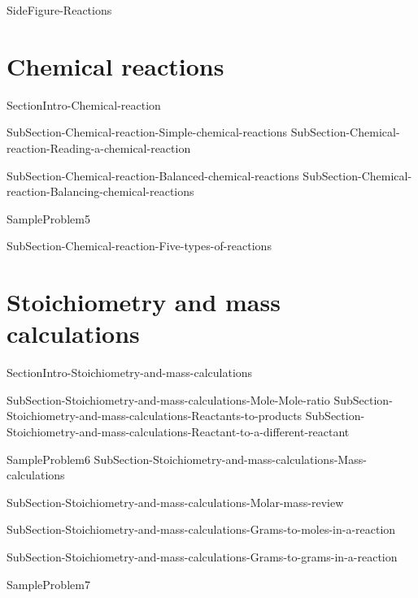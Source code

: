 \documentclass[main.tex]{subfiles}
\begin{document}
{SideFigure-Reactions}


\section{Chemical reactions}
{SectionIntro-Chemical-reaction}

\sloppy\begin{description}


{SubSection-Chemical-reaction-Simple-chemical-reactions}
{SubSection-Chemical-reaction-Reading-a-chemical-reaction}




{SubSection-Chemical-reaction-Balanced-chemical-reactions}
{SubSection-Chemical-reaction-Balancing-chemical-reactions}





{SampleProblem5}


{SubSection-Chemical-reaction-Five-types-of-reactions}


\end{description}



\section{Stoichiometry and mass calculations}
{SectionIntro-Stoichiometry-and-mass-calculations}


\sloppy \begin{description}

{SubSection-Stoichiometry-and-mass-calculations-Mole-Mole-ratio}
{SubSection-Stoichiometry-and-mass-calculations-Reactants-to-products}
{SubSection-Stoichiometry-and-mass-calculations-Reactant-to-a-different-reactant}








{SampleProblem6}
{SubSection-Stoichiometry-and-mass-calculations-Mass-calculations}

{SubSection-Stoichiometry-and-mass-calculations-Molar-mass-review}


{SubSection-Stoichiometry-and-mass-calculations-Grams-to-moles-in-a-reaction}




{SubSection-Stoichiometry-and-mass-calculations-Grams-to-grams-in-a-reaction}


{SampleProblem7}

\end{description}
\end{document}
